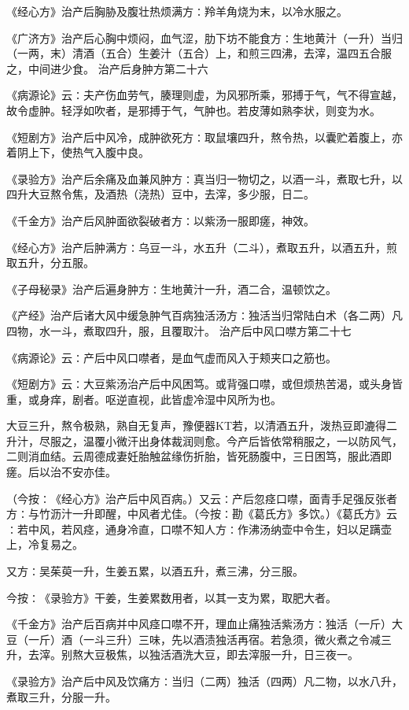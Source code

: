 \documentclass[a4paper,12pt,UTF8,twoside]{ctexbook}
\begin{document}
《经心方》治产后胸胁及腹壮热烦满方∶羚羊角烧为末，以冷水服之。

《广济方》治产后心胸中烦闷，血气涩，肋下坊不能食方∶生地黄汁（一升）当归（一两，末）清酒（五合）生姜汁（五合）上，和煎三四沸，去滓，温四五合服之，中间进少食。
治产后身肿方第二十六

《病源论》云∶夫产伤血劳气，腠理则虚，为风邪所乘，邪搏于气，气不得宣越，故令虚肿。轻浮如吹者，是邪搏于气，气肿也。若皮薄如熟李状，则变为水。

《短剧方》治产后中风冷，成肿欲死方∶取鼠壤四升，熬令热，以囊贮着腹上，亦着阴上下，使热气入腹中良。

《录验方》治产后余痛及血兼风肿方∶真当归一物切之，以酒一斗，煮取七升，以四升大豆熬令焦，及酒热（浇热）豆中，去滓，多少服，日二。

《千金方》治产后风肿面欲裂破者方∶以紫汤一服即瘥，神效。

《经心方》治产后肿满方∶乌豆一斗，水五升（二斗），煮取五升，以酒五升，煎取五升，分五服。

《子母秘录》治产后遍身肿方∶生地黄汁一升，酒二合，温顿饮之。

《产经》治产后诸大风中缓急肿气百病独活汤方∶独活当归常陆白术（各二两）凡四物，水一斗，煮取四升，服，且覆取汁。
治产后中风口噤方第二十七

《病源论》云∶产后中风口噤者，是血气虚而风入于颊夹口之筋也。

《短剧方》云∶大豆紫汤治产后中风困笃。或背强口噤，或但烦热苦渴，或头身皆重，或身痒，剧者。呕逆直视，此皆虚冷湿中风所为也。

大豆三升，熬令极熟，熟自无复声，豫便器KT若，以清酒五升，泼热豆即漉得二升汁，尽服之，温覆小微汗出身体裁润则愈。今产后皆依常稍服之，一以防风气，二则消血结。云周德成妻妊胎触盆缘伤折胎，皆死肠腹中，三日困笃，服此酒即瘥。后以治不安亦佳。

（今按∶《经心方》治产后中风百病。）又云∶产后忽痉口噤，面青手足强反张者方∶与竹沥汁一升即醒，中风者尤佳。（今按∶勘《葛氏方》多饮。）《葛氏方》云∶若中风，若风痉，通身冷直，口噤不知人方∶作沸汤纳壶中令生，妇以足蹒壶上，冷复易之。

又方∶吴茱萸一升，生姜五累，以酒五升，煮三沸，分三服。

今按∶《录验方》干姜，生姜累数用者，以其一支为累，取肥大者。

《千金方》治产后百病并中风痉口噤不开，理血止痛独活紫汤方∶独活（一斤）大豆（一斤）酒（一斗三升）三味，先以酒渍独活再宿。若急须，微火煮之令减三升，去滓。别熬大豆极焦，以独活酒洗大豆，即去滓服一升，日三夜一。

《录验方》治产后中风及饮痛方∶当归（二两）独活（四两）凡二物，以水八升，煮取三升，分服一升。
\end{document}

